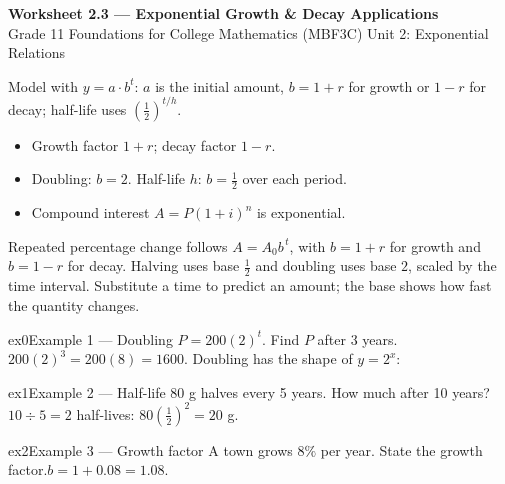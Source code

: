 \documentclass[11pt]{article}
\begin{document}
\begin{center}
{\LARGE\bfseries\color{titleblue}Worksheet 2.3 --- Exponential Growth \& Decay Applications}\\[2pt]
{\small Grade 11 Foundations for College Mathematics (MBF3C) \textperiodcentered{} Unit 2: Exponential Relations}
\end{center}

\begin{ideabox}
Model with $y=a\cdot b^t$: $a$ is the initial amount, $b=1+r$ for growth or $1-r$ for decay; half-life uses $\left(\tfrac12\right)^{t/h}$.
\begin{itemize}[leftmargin=*,itemsep=2pt]
  \item Growth factor $1+r$; decay factor $1-r$.
  \item Doubling: $b=2$. Half-life $h$: $b=\tfrac12$ over each period.
  \item Compound interest $A=P(1+i)^n$ is exponential.
\end{itemize}
\end{ideabox}

\begin{learnbox}
Repeated percentage change follows $A=A_0 b^{\,t}$, with $b=1+r$ for growth and $b=1-r$ for decay.
Halving uses base $\tfrac12$ and doubling uses base $2$, scaled by the time interval.
Substitute a time to predict an amount; the base shows how fast the quantity changes.
\end{learnbox}


\begin{example}{ex0}{Example 1 --- Doubling}
$P=200(2)^t$. Find $P$ after 3 years.\soln $200(2)^3=200(8)=1600$. Doubling has the shape of $y=2^x$:
\end{example}

\begin{example}{ex1}{Example 2 --- Half-life}
80 g halves every 5 years. How much after 10 years?\soln $10\div5=2$ half-lives: $80\left(\tfrac12\right)^2=20$ g.
\end{example}

\begin{example}{ex2}{Example 3 --- Growth factor}
A town grows $8\%$ per year. State the growth factor.\soln $b=1+0.08=1.08$.
\end{example}
\end{document}
